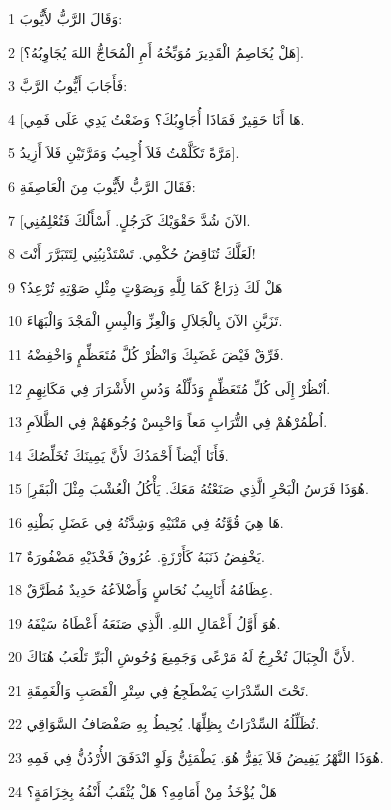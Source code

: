 \par 1 وَقَالَ الرَّبُّ لأَيُّوبَ:
\par 2 [هَلْ يُخَاصِمُ الْقَدِيرَ مُوَبِّخُهُ أَمِ الْمُحَاجُّ اللهَ يُجَاوِبُهُ؟].
\par 3 فَأَجَابَ أَيُّوبُ الرَّبَّ:
\par 4 [هَا أَنَا حَقِيرٌ فَمَاذَا أُجَاوِبُكَ؟ وَضَعْتُ يَدِي عَلَى فَمِي.
\par 5 مَرَّةً تَكَلَّمْتُ فَلاَ أُجِيبُ وَمَرَّتَيْنِ فَلاَ أَزِيدُ].
\par 6 فَقَالَ الرَّبُّ لأَيُّوبَ مِنَ الْعَاصِفَةِ:
\par 7 [الآنَ شُدَّ حَقْوَيْكَ كَرَجُلٍ. أَسْأَلُكَ فَتُعْلِمُنِي.
\par 8 لَعَلَّكَ تُنَاقِضُ حُكْمِي. تَسْتَذْنِبُنِي لِتَتَبَرَّرَ أَنْتَ!
\par 9 هَلْ لَكَ ذِرَاعٌ كَمَا لِلَّهِ وَبِصَوْتٍ مِثْلِ صَوْتِهِ تُرْعِدُ؟
\par 10 تَزَيَّنِ الآنَ بِالْجَلاَلِ وَالْعِزِّ وَالْبِسِ الْمَجْدَ وَالْبَهَاءَ.
\par 11 فَرِّقْ فَيْضَ غَضَبِكَ وَانْظُرْ كُلَّ مُتَعَظِّمٍ وَاخْفِضْهُ.
\par 12 اُنْظُرْ إِلَى كُلِّ مُتَعَظِّمٍ وَذَلِّلْهُ وَدُسِ الأَشْرَارَ فِي مَكَانِهِمِ.
\par 13 اُطْمُرْهُمْ فِي التُّرَابِ مَعاً وَاحْبِسْ وُجُوهَهُمْ فِي الظَّلاَمِ.
\par 14 فَأَنَا أَيْضاً أَحْمَدُكَ لأَنَّ يَمِينَكَ تُخَلِّصُكَ.
\par 15 [هُوَذَا فَرَسُ الْبَحْرِ الَّذِي صَنَعْتُهُ مَعَكَ. يَأْكُلُ الْعُشْبَ مِثْلَ الْبَقَرِ.
\par 16 هَا هِيَ قُوَّتُهُ فِي مَتْنَيْهِ وَشِدَّتُهُ فِي عَضَلِ بَطْنِهِ.
\par 17 يَخْفِضُ ذَنَبَهُ كَأَرْزَةٍ. عُرُوقُ فَخْذَيْهِ مَضْفُورَةٌ.
\par 18 عِظَامُهُ أَنَابِيبُ نُحَاسٍ وَأَضْلاَعُهُ حَدِيدٌ مُطَرَّقٌ.
\par 19 هُوَ أَوَّلُ أَعْمَالِ اللهِ. الَّذِي صَنَعَهُ أَعْطَاهُ سَيْفَهُ.
\par 20 لأَنَّ الْجِبَالَ تُخْرِجُ لَهُ مَرْعًى وَجَمِيعَ وُحُوشِ الْبَرِّ تَلْعَبُ هُنَاكَ.
\par 21 تَحْتَ السِّدْرَاتِ يَضْطَجِعُ فِي سِتْرِ الْقَصَبِ وَالْغَمِقَةِ.
\par 22 تُظَلِّلُهُ السِّدْرَاتُ بِظِلِّهَا. يُحِيطُ بِهِ صَفْصَافُ السَّوَاقِي.
\par 23 هُوَذَا النَّهْرُ يَفِيضُ فَلاَ يَفِرُّ هُوَ. يَطْمَئِنُّ وَلَوِ انْدَفَقَ الأُرْدُنُّ فِي فَمِهِ.
\par 24 هَلْ يُؤْخَذُ مِنْ أَمَامِهِ؟ هَلْ يُثْقَبُ أَنْفُهُ بِخِزَامَةٍ؟

